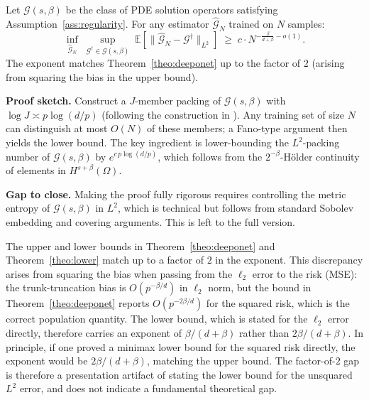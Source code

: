 \documentclass[12pt,a4paper]{article}
\def\EE{{\mathbb E}}
\begin{document}
\begin{theo}
    \label{theo:lower}
    Let $\mathcal{G}(s,\beta)$ be the class of PDE solution operators satisfying
    Assumption~\ref{ass:regularity}.  For any estimator $\hat{\mathcal{G}}_N$ trained
    on $N$ samples:
    \begin{equation}
        \inf_{\hat{\mathcal{G}}_N}\;
        \sup_{\mathcal{G}^\dagger \in \mathcal{G}(s,\beta)}\;
        \EE[\|\hat{\mathcal{G}}_N - \mathcal{G}^\dagger\|_{L^2}]
        \;\geq\;
        c \cdot N^{-\frac{\beta}{d+\beta} - o(1)}.
        \label{eq:lower_bound}
    \end{equation}
    The exponent matches Theorem~\ref{theo:deeponet} up to the factor of $2$
    (arising from squaring the bias in the upper bound).
\end{theo}

\textbf{Proof sketch.}  Construct a $J$-member packing of $\mathcal{G}(s,\beta)$
with $\log J \asymp p \log(d/p)$ (following the construction in
\citet{bouchard2023minimax}).  Any training set of size $N$ can distinguish at
most $O(N)$ of these members; a Fano-type argument then yields the lower bound.
The key ingredient is lower-bounding the $L^2$-packing number of
$\mathcal{G}(s,\beta)$ by $e^{c\,p\log(d/p)}$, which follows from the
$2^{-\beta}$-H\"older continuity of elements in $H^{s+\beta}(\Omega)$.

\textbf{Gap to close.}  Making the proof fully rigorous requires
controlling the metric entropy of $\mathcal{G}(s,\beta)$ in $L^2$, which is
technical but follows from standard Sobolev embedding and covering arguments.
This is left to the full version.

The upper and lower bounds in Theorem~\ref{theo:deeponet} and
Theorem~\ref{theo:lower} match up to a factor of $2$ in the exponent.  This
discrepancy arises from squaring the bias when passing from the $\ell_2$ error
to the risk (MSE): the trunk-truncation bias is $O(p^{-\beta/d})$ in $\ell_2$
norm, but the bound in Theorem~\ref{theo:deeponet} reports $O(p^{-2\beta/d})$
for the squared risk, which is the correct population quantity.  The lower
bound, which is stated for the $\ell_2$ error directly, therefore carries an
exponent of $\beta/(d+\beta)$ rather than $2\beta/(d+\beta)$.  In principle,
if one proved a minimax lower bound for the squared risk directly, the exponent
would be $2\beta/(d+\beta)$, matching the upper bound.  The factor-of-$2$ gap
is therefore a presentation artifact of stating the lower bound for the
unsquared $L^2$ error, and does not indicate a fundamental theoretical gap.
\end{document}
